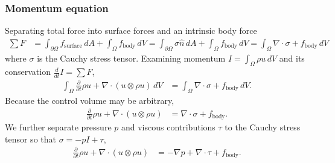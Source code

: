 \documentclass[letterpaper,11pt,nointlimits]{amsart}
\begin{document}
\subsubsection{Momentum equation} 
Separating total force into surface forces and an intrinsic body force
\begin{align}
  \sum{}F
  &= 
     \int_{\partial\Omega} f_\text{surface} \, dA 
   + \int_{\Omega} f_\text{body} \, dV 
  = 
     \int_{\partial\Omega} \sigma \hat{n} \, dA 
  +  \int_{\Omega} f_\text{body} \, dV 
  =  \int_{\Omega} \nabla\cdot\sigma + f_\text{body} \, dV 
\end{align}
where $\sigma$ is the Cauchy stress tensor.  Examining
momentum $I=\int_{\Omega} \rho{}u\,dV$ and its conservation
$\frac{d}{dt}I=\sum{}F$,
\begin{align}
    \int_{\Omega}\frac{\partial{}}{\partial{}t}\rho{}u
  + \nabla\cdot(u\otimes{}\rho{}u)\,dV
&= \int_{\Omega} \nabla\cdot\sigma + f_\text{body} \, dV 
.
\end{align}
Because the control volume may be arbitrary, 
\begin{align}
  \frac{\partial{}}{\partial{}t}\rho{}u + \nabla\cdot(u\otimes{}\rho{}u) 
&= \nabla\cdot\sigma + f_\text{body}
.
\end{align}
We further separate pressure $p$ and viscous contributions $\tau$ to
the Cauchy stress tensor so that $\sigma = -p I + \tau$,
\begin{align}
\label{eq:cons_momentum}
\frac{\partial{}}{\partial{}t}\rho{}u + \nabla\cdot(u\otimes{}\rho{}u) 
&= -\nabla{}p + \nabla\cdot{}\tau + f_\text{body}
.
\end{align}
\end{document}
